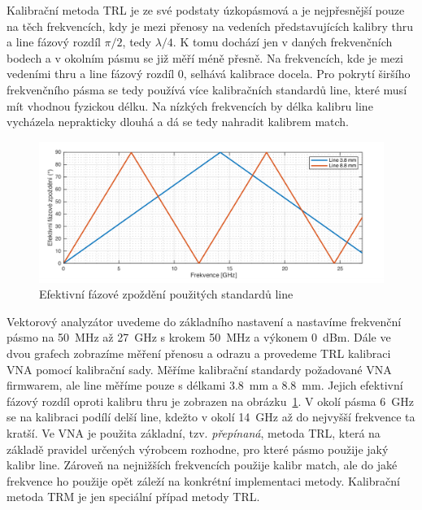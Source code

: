\documentclass[11pt,a4paper]{article}
\begin{document}
Kalibrační metoda TRL je ze své podstaty úzkopásmová a je nejpřesnější pouze na těch frekvencích, kdy je mezi přenosy na vedeních představujících kalibry thru a line fázový rozdíl $\pi/2$, tedy $\lambda/4$. K tomu dochází jen v daných frekvenčních bodech a v okolním pásmu se již měří méně přesně. Na frekvencích, kde je mezi vedeními thru a line fázový rozdíl 0, selhává kalibrace docela. Pro pokrytí širšího frekvenčního pásma se tedy používá více kalibračních standardů line, které musí mít vhodnou fyzickou délku. Na nízkých frekvencích by délka kalibru line vycházela neprakticky dlouhá a dá se tedy nahradit kalibrem match.
\begin{figure}[!ht]
    \centering
    \includegraphics[width=.8\textwidth]{src/fazove-zpozdeni.png}
    \caption{\label{fig:fazove-zpozdeni}Efektivní fázové zpoždění použitých standardů line}
\end{figure}

Vektorový analyzátor uvedeme do základního nastavení a nastavíme frekvenční pásmo na 50~MHz až 27~GHz s krokem 50~MHz a výkonem 0~dBm. Dále ve dvou grafech zobrazíme měření přenosu a odrazu a provedeme TRL kalibraci VNA pomocí kalibrační sady. Měříme kalibrační standardy požadované VNA firmwarem, ale line měříme pouze s délkami 3.8~mm a 8.8~mm. Jejich efektivní fázový rozdíl oproti kalibru thru je zobrazen na obrázku~\ref{fig:fazove-zpozdeni}. V okolí pásma 6~GHz se na kalibraci podílí delší line, kdežto v okolí 14~GHz až do nejvyšší frekvence ta kratší. Ve VNA je použita základní, tzv. \emph{přepínaná}, metoda TRL, která na základě pravidel určených výrobcem rozhodne, pro které pásmo použije jaký kalibr line. Zároveň na nejnižších frekvencích použije kalibr match, ale do jaké frekvence ho použije opět záleží na konkrétní implementaci metody. Kalibrační metoda TRM je jen speciální případ metody TRL.
\end{document}
